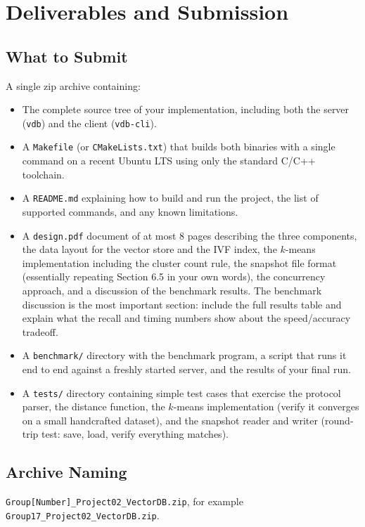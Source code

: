 \documentclass[11pt,a4paper]{article}
\begin{document}
\section{Deliverables and Submission}

\subsection{What to Submit}
A single zip archive containing:

\begin{itemize}
\item The complete source tree of your implementation, including both the server (\texttt{vdb}) and the client (\texttt{vdb-cli}).
\item A \texttt{Makefile} (or \texttt{CMakeLists.txt}) that builds both binaries with a single command on a recent Ubuntu LTS using only the standard C/C++ toolchain.
\item A \texttt{README.md} explaining how to build and run the project, the list of supported commands, and any known limitations.
\item A \texttt{design.pdf} document of at most 8 pages describing the three components, the data layout for the vector store and the IVF index, the $k$-means implementation including the cluster count rule, the snapshot file format (essentially repeating Section 6.5 in your own words), the concurrency approach, and a discussion of the benchmark results. The benchmark discussion is the most important section: include the full results table and explain what the recall and timing numbers show about the speed/accuracy tradeoff.
\item A \texttt{benchmark/} directory with the benchmark program, a script that runs it end to end against a freshly started server, and the results of your final run.
\item A \texttt{tests/} directory containing simple test cases that exercise the protocol parser, the distance function, the $k$-means implementation (verify it converges on a small handcrafted dataset), and the snapshot reader and writer (round-trip test: save, load, verify everything matches).
\end{itemize}

\subsection{Archive Naming}
\texttt{Group[Number]\_Project02\_VectorDB.zip}, for example \texttt{Group17\_Project02\_VectorDB.zip}.
\end{document}

